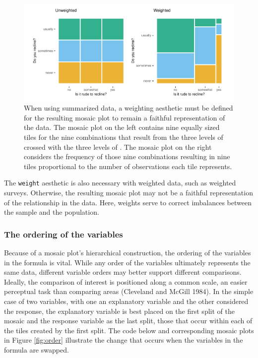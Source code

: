 \begin{figure}

{\centering \includegraphics[width=1\linewidth]{jeppson-hofmann_files/figure-latex/weight-1} 

}

\caption{When using summarized data, a weighting aesthetic must be defined for the resulting mosaic plot to remain a faithful representation of the data. The mosaic plot on the left contains nine equally sized tiles for the nine combinations that result from the three levels of  crossed with the three levels of . The mosaic plot on the right considers the frequency of those nine combinations resulting in nine tiles proportional to the number of observations each tile represents.}\label{fig:weight}
\end{figure}

The \texttt{weight} aesthetic is also necessary with weighted data, such as weighted surveys. Otherwise, the resulting mosaic plot may not be a faithful representation of the relationship in the data. Here, weights serve to correct imbalances between the sample and the population.

\hypertarget{the-ordering-of-the-variables}{%
\subsubsection{The ordering of the variables}\label{the-ordering-of-the-variables}}

Because of a mosaic plot's hierarchical construction, the ordering of the variables in the formula is vital. While any order of the variables ultimately represents the same data, different variable orders may better support different comparisons. Ideally, the comparison of interest is positioned along a common scale, an easier perceptual task than comparing areas (Cleveland and McGill 1984). In the simple case of two variables, with one an explanatory variable and the other considered the response, the explanatory variable is best placed on the first split of the mosaic and the response variable as the last split, those that occur within each of the tiles created by the first split. The code below and corresponding mosaic plots in Figure \ref{fig:order} illustrate the change that occurs when the variables in the formula are swapped.

